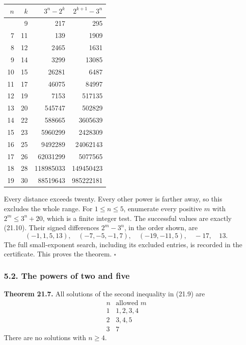 \documentclass[
  11pt,
  a4paper,
]{article}
\newcounter{none} %
\begin{document}
{\def\LTcaptype{none} %
\begin{longtable}[]{@{}rrrr@{}}
\toprule\noalign{}
\(n\) & \(k\) & \(3^n-2^k\) & \(2^{k+1}-3^n\) \\
\midrule\noalign{}
\endhead
\bottomrule\noalign{}
\endlastfoot
6 & 9 & 217 & 295 \\
7 & 11 & 139 & 1909 \\
8 & 12 & 2465 & 1631 \\
9 & 14 & 3299 & 13085 \\
10 & 15 & 26281 & 6487 \\
11 & 17 & 46075 & 84997 \\
12 & 19 & 7153 & 517135 \\
13 & 20 & 545747 & 502829 \\
14 & 22 & 588665 & 3605639 \\
15 & 23 & 5960299 & 2428309 \\
16 & 25 & 9492289 & 24062143 \\
17 & 26 & 62031299 & 5077565 \\
18 & 28 & 118985033 & 149450423 \\
19 & 30 & 88519643 & 985222181 \\
\end{longtable}
}

Every distance exceeds twenty. Every other power is farther away, so
this excludes the whole range. For \(1\le n\le5\), enumerate every
positive \(m\) with \(2^m\le3^n+20\), which is a finite integer test.
The successful values are exactly (21.10). Their signed differences
\(2^m-3^n\), in the order shown, are \[
 (-1,1,5,13),\quad(-7,-5,-1,7),\quad(-19,-11,5),\quad-17,\quad13.
\] The full small-exponent search, including its excluded entries, is
recorded in the certificate. This proves the theorem. \(\square\)

\subsubsection{5.2. The powers of two and
five}\label{the-powers-of-two-and-five}

\textbf{Theorem 21.7.} All solutions of the second inequality in (21.9)
are \[
\begin{array}{c|l}
n&\text{allowed }m\\ \hline
1&1,2,3,4\\
2&3,4,5\\
3&7
\end{array}
\tag{21.14}
\] There are no solutions with \(n\ge4\).
\end{document}
